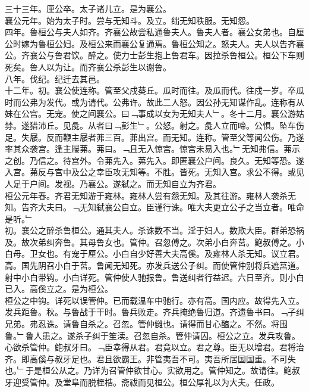 \documentclass{zhvt-classic}
\begin{document}
\hspace*{2em}三十三年。厘公卒。太子诸儿立。是为襄公。\\
\hspace*{2em}襄公元年。始为太子时。尝与无知斗。及立。绌无知秩服。无知怨。\\
\hspace*{2em}四年。鲁桓公与夫人如齐。齐襄公故尝私通鲁夫人。鲁夫人者。襄公女弟也。自厘公时嫁为鲁桓公妇。及桓公来而襄公复通焉。鲁桓公知之。怒夫人。夫人以告齐襄公。齐襄公与鲁君饮。醉之。使力士彭生抱上鲁君车。因拉杀鲁桓公。桓公下车则死矣。鲁人以为让。而齐襄公杀彭生以谢鲁。\\
\hspace*{2em}八年。伐纪。纪迁去其邑。\\
\hspace*{2em}十二年。初。襄公使连称。管至父戍葵丘。瓜时而往。及瓜而代。往戍一岁。卒瓜时而公弗为发代。或为请代。公弗许。故此二人怒。因公孙无知谋作乱。连称有从妹在公宫。无宠。使之间襄公。曰﹁事成以女为无知夫人﹂。冬十二月。襄公游姑棼。遂猎沛丘。见彘。从者曰﹁彭生﹂。公怒。射之。彘人立而啼。公惧。坠车伤足。失屦。反而鞭主屦者茀三百。茀出宫。而无知。连称。管至父等闻公伤。乃遂率其众袭宫。逢主屦茀。茀曰。﹁且无入惊宫。惊宫未易入也。﹂无知弗信。茀示之创。乃信之。待宫外。令茀先入。茀先入。即匿襄公户间。良久。无知等恐。遂入宫。茀反与宫中及公之幸臣攻无知等。不胜。皆死。无知入宫。求公不得。或见人足于户间。发视。乃襄公。遂弑之。而无知自立为齐君。\\
\hspace*{2em}桓公元年春。齐君无知游于雍林。雍林人尝有怨无知。及其往游。雍林人袭杀无知。告齐大夫曰。﹁无知弑襄公自立。臣谨行诛。唯大夫更立公子之当立者。唯命是听。﹂\\
\hspace*{2em}初。襄公之醉杀鲁桓公。通其夫人。杀诛数不当。淫于妇人。数欺大臣。群弟恐祸及。故次弟纠奔鲁。其母鲁女也。管仲。召忽傅之。次弟小白奔莒。鲍叔傅之。小白母。卫女也。有宠于厘公。小白自少好善大夫高傒。及雍林人杀无知。议立君。高。国先阴召小白于莒。鲁闻无知死。亦发兵送公子纠。而使管仲别将兵遮莒道。射中小白带钩。小白详死。管仲使人驰报鲁。鲁送纠者行益迟。六日至齐。则小白已入。高傒立之。是为桓公。\\
\hspace*{2em}桓公之中钩。详死以误管仲。已而载温车中驰行。亦有高。国内应。故得先入立。发兵距鲁。秋。与鲁战于干时。鲁兵败走。齐兵掩绝鲁归道。齐遗鲁书曰。﹁子纠兄弟。弗忍诛。请鲁自杀之。召忽。管仲雠也。请得而甘心醢之。不然。将围鲁。﹂鲁人患之。遂杀子纠于笙渎。召忽自杀。管仲请囚。桓公之立。发兵攻鲁。心欲杀管仲。鲍叔牙曰。﹁臣幸得从君。君竟以立。君之尊。臣无以增君。君将治齐。即高傒与叔牙足也。君且欲霸王。非管夷吾不可。夷吾所居国国重。不可失也。﹂于是桓公从之。乃详为召管仲欲甘心。实欲用之。管仲知之。故请往。鲍叔牙迎受管仲。及堂阜而脱桎梏。斋祓而见桓公。桓公厚礼以为大夫。任政。\\
\end{document}
